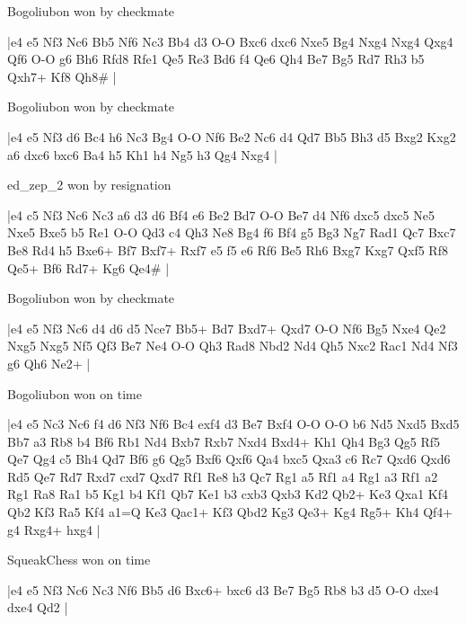 \showboard

Bogoliubon won by checkmate

\makegametitle
|e4 e5 Nf3 Nc6 Bb5 Nf6 Nc3 Bb4 d3 O-O Bxc6 dxc6 Nxe5 Bg4 Nxg4 Nxg4 Qxg4 Qf6 O-O g6 Bh6 Rfd8 Rfe1 Qe5 Re3 Bd6 f4 Qe6 Qh4 Be7 Bg5 Rd7 Rh3 b5 Qxh7+ Kf8 Qh8\#  |

\showboard

Bogoliubon won by checkmate

\makegametitle
|e4 e5 Nf3 d6 Bc4 h6 Nc3 Bg4 O-O Nf6 Be2 Nc6 d4 Qd7 Bb5 Bh3 d5 Bxg2 Kxg2 a6 dxc6 bxc6 Ba4 h5 Kh1 h4 Ng5 h3 Qg4 Nxg4  |

\showboard

ed\_zep\_2 won by resignation

\makegametitle
|e4 c5 Nf3 Nc6 Nc3 a6 d3 d6 Bf4 e6 Be2 Bd7 O-O Be7 d4 Nf6 dxc5 dxc5 Ne5 Nxe5 Bxe5 b5 Re1 O-O Qd3 c4 Qh3 Ne8 Bg4 f6 Bf4 g5 Bg3 Ng7 Rad1 Qc7 Bxc7 Be8 Rd4 h5 Bxe6+ Bf7 Bxf7+ Rxf7 e5 f5 e6 Rf6 Be5 Rh6 Bxg7 Kxg7 Qxf5 Rf8 Qe5+ Bf6 Rd7+ Kg6 Qe4\#  |

\showboard

Bogoliubon won by checkmate

\makegametitle
|e4 e5 Nf3 Nc6 d4 d6 d5 Nce7 Bb5+ Bd7 Bxd7+ Qxd7 O-O Nf6 Bg5 Nxe4 Qe2 Nxg5 Nxg5 Nf5 Qf3 Be7 Ne4 O-O Qh3 Rad8 Nbd2 Nd4 Qh5 Nxc2 Rac1 Nd4 Nf3 g6 Qh6 Ne2+  |

\showboard

Bogoliubon won on time

\makegametitle
|e4 e5 Nc3 Nc6 f4 d6 Nf3 Nf6 Bc4 exf4 d3 Be7 Bxf4 O-O O-O b6 Nd5 Nxd5 Bxd5 Bb7 a3 Rb8 b4 Bf6 Rb1 Nd4 Bxb7 Rxb7 Nxd4 Bxd4+ Kh1 Qh4 Bg3 Qg5 Rf5 Qe7 Qg4 c5 Bh4 Qd7 Bf6 g6 Qg5 Bxf6 Qxf6 Qa4 bxc5 Qxa3 c6 Rc7 Qxd6 Qxd6 Rd5 Qe7 Rd7 Rxd7 cxd7 Qxd7 Rf1 Re8 h3 Qc7 Rg1 a5 Rf1 a4 Rg1 a3 Rf1 a2 Rg1 Ra8 Ra1 b5 Kg1 b4 Kf1 Qb7 Ke1 b3 cxb3 Qxb3 Kd2 Qb2+ Ke3 Qxa1 Kf4 Qb2 Kf3 Ra5 Kf4 a1=Q Ke3 Qac1+ Kf3 Qbd2 Kg3 Qe3+ Kg4 Rg5+ Kh4 Qf4+ g4 Rxg4+ hxg4  |

\showboard

SqueakChess won on time

\makegametitle
|e4 e5 Nf3 Nc6 Nc3 Nf6 Bb5 d6 Bxc6+ bxc6 d3 Be7 Bg5 Rb8 b3 d5 O-O dxe4 dxe4 Qd2  |


